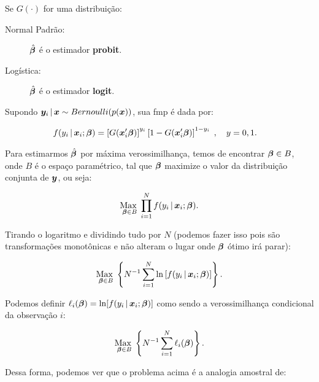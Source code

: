 \documentclass[11pt, oneside, a4paper, article]{article}
\numberwithin{equation}{section}
\begin{document}
\begin{description}
Se $G(\cdot)$ for uma distribuição:

\begin{description}
\item [Normal Padrão:] $\hat{\boldsymbol{\beta}}$ é o estimador \textbf{probit}.
\item [Logística:] $\hat{\boldsymbol{\beta}}$ é o estimador \textbf{logit}.
\end{description}

Supondo $\boldsymbol{y}_{i} \, | \, \boldsymbol{x} \sim Bernoulli(p(\boldsymbol{x}))$, sua fmp é dada por:

\vspace{-1 em}
\begin{align*}
f( y_{i} \, | \, \boldsymbol{x}_{i} ; \boldsymbol{\beta} ) 
&= 
\left[ G(\boldsymbol{x}_{i}' \boldsymbol{\beta} )  \right]^{y_{i}}
\left[ 1 - G(\boldsymbol{x}_{i}' \boldsymbol{\beta} )  \right]^{1 - y_{i}}
\; , \quad y=0,1.
\end{align*}

Para estimarmos $\hat{\boldsymbol{\beta}}$ por máxima verossimilhança, temos de encontrar $\boldsymbol{\beta} \in B$, onde $B$ é o espaço paramétrico, tal que $\boldsymbol{\beta}$ maximize o valor da distribuição conjunta de $\boldsymbol{y}$, ou seja:

\vspace{-1 em}
\begin{align*}
\underset{\boldsymbol{\beta} \in B}{\text{Max }} 
\prod_{i=1}^{N}
f( y_{i} \, | \, \boldsymbol{x}_{i} ; \boldsymbol{\beta} ).
\end{align*}

\noindent

Tirando o logaritmo e dividindo tudo por $N$ (podemos fazer isso pois são transformações monotônicas e não alteram o lugar onde $\boldsymbol{\beta}$ ótimo irá parar):

\vspace{-1 em}
\begin{align*}
\underset{\boldsymbol{\beta} \in B}{\text{Max }} 
\left\{ 
N^{-1} \sum_{i=1}^{N}
\ln \left[ f( y_{i} \, | \, \boldsymbol{x}_{i} ; \boldsymbol{\beta} ) \right]
\right\}.
\end{align*}

\noindent
Podemos definir
$\ell_{i}( \boldsymbol{\beta} ) = \ln[ f( y_{i} \, | \, \boldsymbol{x}_{i} ; \boldsymbol{\beta} ) ]$
como sendo a verossimilhança condicional da observação $i$:

\vspace{-1 em}
\begin{align*}
\underset{\boldsymbol{\beta} \in B}{\text{Max }} 
\left\{ 
N^{-1} \sum_{i=1}^{N} \ell_{i} (\boldsymbol{\beta})
\right\}.
\end{align*}

Dessa forma, podemos ver que o problema acima é a analogia amostral de:


\end{description}
\end{document}
